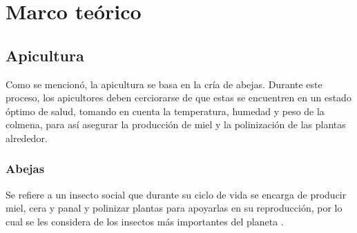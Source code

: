 \documentclass[journal]{IEEEtran} %
\begin{document}
\section{Marco teórico}

\subsection{Apicultura}
Como se mencionó, la apicultura se basa en la cría de abejas. Durante este proceso, los apicultores deben cerciorarse de que estas se encuentren en un estado óptimo de salud, tomando en cuenta la temperatura, humedad y peso de la colmena, para así asegurar la producción de miel y la polinización de las plantas alrededor.
\subsubsection{Abejas}
Se refiere a un insecto social que durante su ciclo de vida se encarga de producir miel, cera y panal y polinizar plantas para apoyarlas en su reproducción, por lo cual se les considera de los insectos más importantes del planeta \cite{DavidCrampABEEKEEPING}.
\end{document}
